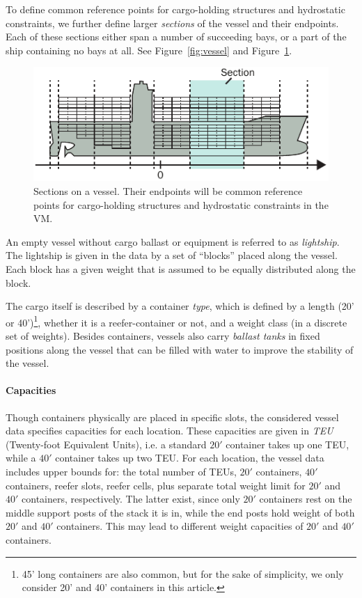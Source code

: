 To define common reference points for cargo-holding structures and hydrostatic constraints, we further define larger \emph{sections} of the vessel and their endpoints. Each of these sections either span a number of succeeding bays, or a part of the ship containing no bays at all.
See Figure~\ref{fig:vessel} and Figure~\ref{fig:sectionEndPoints}.

\begin{figure}[hb]
	\centering
		\includegraphics{figures/sectionEndPoints.pdf}
	\caption{Sections on a vessel. Their endpoints will be common reference points for cargo-holding structures and hydrostatic constraints in the VM.}
	\label{fig:sectionEndPoints}
\end{figure}

An empty vessel without cargo ballast or equipment is referred to as \emph{lightship}.  The lightship is given in the data by a set of ``blocks'' placed along the vessel. Each block has a given weight that is assumed to be equally distributed along the block.

The cargo itself is described by a container \emph{type}, which is defined by a length (20' or 40')\footnote{45' long containers are also common, but for the sake of simplicity, we only consider 20' and 40' containers in this article.}, whether it is a reefer-container or not, and a weight class (in a discrete set of weights). 
Besides containers, vessels also carry \emph{ballast tanks} in fixed positions along the vessel that can be filled with water to improve the stability of the vessel.

\paragraph{Capacities}
Though containers physically are placed in specific slots, the considered vessel data specifies capacities for each location. These capacities are given in \emph{TEU} (Twenty-foot Equivalent Units), i.e. a standard $20'$ container takes up one TEU, while a $40'$ container takes up two TEU. For each location, the vessel data includes upper bounds for: the total number of TEUs, $20'$ containers, $40'$ containers, reefer slots, reefer cells, plus separate total weight limit for $20'$ and $40'$ containers, respectively. The latter exist, since only $20'$ containers rest on the middle support posts of the stack it is in, while the end posts hold weight of both $20'$ and $40'$ containers. This may lead to different weight capacities of $20'$ and $40'$ containers.

